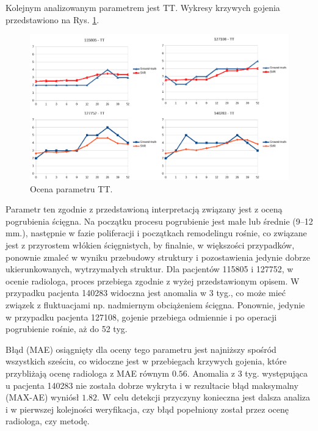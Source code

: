Kolejnym analizowanym parametrem jest TT. Wykresy krzywych gojenia przedstawiono na Rys. \ref{fig:TT}.    
\begin{figure}[h!]
	\centering
	\includegraphics[width=1\textwidth]{figures/TT.png}
	\caption{Ocena parametru TT.}\label{fig:TT}
\end{figure}
Parametr ten zgodnie z przedstawioną interpretacją związany jest z oceną pogrubienia ścięgna. Na początku procesu pogrubienie jest małe lub średnie (9--12 mm.), następnie w fazie poliferacji i początkach remodelingu rośnie, co związane jest z przyrostem włókien ścięgnistych, by finalnie, w większości przypadków, ponownie zmaleć w wyniku przebudowy struktury i pozostawienia jedynie dobrze ukierunkowanych, wytrzymałych struktur. Dla pacjentów 115805 i 127752, w ocenie radiologa, proces przebiega zgodnie z wyżej przedstawionym opisem. W przypadku pacjenta 140283 widoczna jest anomalia w 3 tyg., co może mieć związek z fluktuacjami np. nadmiernym obciążeniem ścięgna. Ponownie, jedynie w przypadku pacjenta 127108, gojenie przebiega odmiennie i po operacji pogrubienie rośnie, aż do 52 tyg. 

Błąd (MAE) osiągnięty dla oceny tego parametru jest najniższy spośród wszystkich sześciu, co widoczne jest w przebiegach krzywych gojenia, które przybliżają ocenę radiologa z MAE równym $0.56$. Anomalia z 3 tyg. występująca u pacjenta 140283 nie została dobrze wykryta i w rezultacie błąd maksymalny (MAX-AE) wyniósł $1.82$. W celu detekcji przyczyny konieczna jest dalsza analiza i w pierwszej kolejności weryfikacja, czy błąd popełniony został przez ocenę radiologa, czy metodę.

